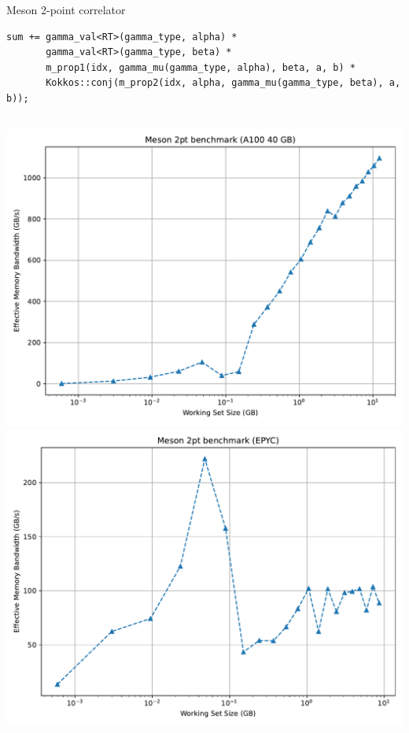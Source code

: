\begin{frame}[fragile]{Meson 2-point correlator}

  \begin{verbatim}
sum += gamma_val<RT>(gamma_type, alpha) *
       gamma_val<RT>(gamma_type, beta) *
       m_prop1(idx, gamma_mu(gamma_type, alpha), beta, a, b) *
       Kokkos::conj(m_prop2(idx, alpha, gamma_mu(gamma_type, beta), a, b));
  \end{verbatim}

  \begin{columns}
      \includegraphics[width=\textwidth]{figs/meson_2pt_bw_A100.pdf}
      \includegraphics[width=\textwidth]{figs/meson_2pt_bw_EPYC.pdf}
  \end{columns}

\end{frame}

